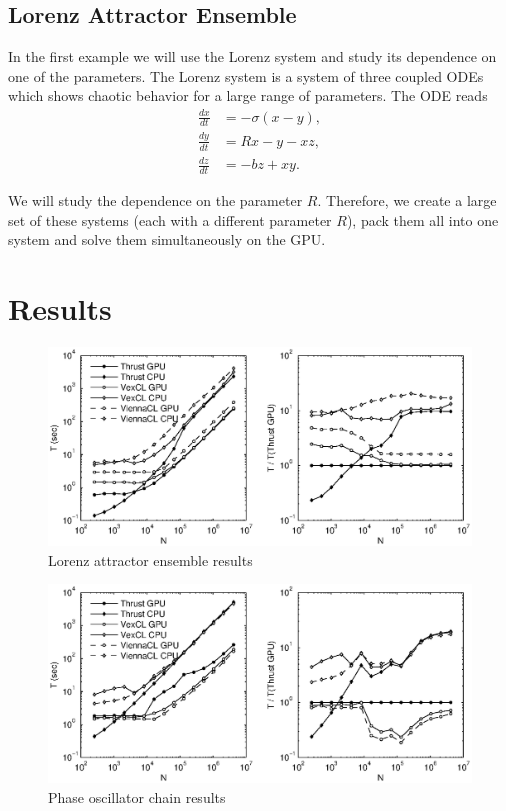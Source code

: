 \documentclass[1p]{elsarticle}
\begin{document}
\subsection{Lorenz Attractor Ensemble}

In the first example we will use the Lorenz system and study its dependence on
one of the parameters. The Lorenz system is a system of three coupled ODEs
which shows chaotic behavior for a large range of parameters. The ODE reads
\begin{align}
    \frac{dx}{dt} &= -\sigma \left( x - y \right), \\
    \frac{dy}{dt} &= R x - y - xz, \\
    \frac{dz}{dt} &= -bz + xy.
\end{align}

We will study the dependence on the parameter $R$. Therefore, we create a large
set of these systems (each with a different parameter $R$), pack them all into
one system and solve them simultaneously on the GPU.

\section{Results}

\begin{figure}[p]
    \begin{center}
        \includegraphics[width=\textwidth]{data/lorenz_ensemble/perfcmp}
    \end{center}
    \caption{Lorenz attractor ensemble results}
    \label{fig:lorenz:perf}
\end{figure}

\begin{figure}[p]
    \begin{center}
        \includegraphics[width=\textwidth]{data/phase_oscillator_chain/perfcmp}
    \end{center}
    \caption{Phase oscillator chain results}
    \label{fig:phase:perf}
\end{figure}
\end{document}
